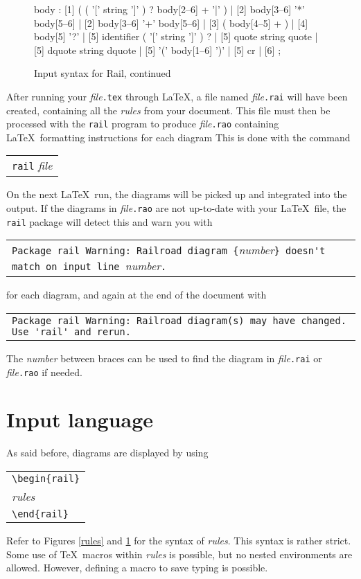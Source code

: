 \documentclass[a4paper]{article}
\newcommand\Rail{Rail}
\newcommand\nt[1]{\textit{#1}}
\newcommand\file[1]{\textit{file}\texttt{.#1}}
\newcommand\lit[1]{\texttt{#1}}
\newenvironment{example}%
{\begin{trivlist}\item[]\begin{tabular}{l}}%
{\end{tabular}\end{trivlist}}
\begin{document}
\begin{figure}
\begin{rail}

body	: [1] ( ( '[' string ']' ) ? body[2--6] + '|' )
	| [2] body[3--6] '*' body[5--6]
	| [2] body[3--6] '+' body[5--6]
	| [3] ( body[4--5] + )
	| [4] body[5] '?'
	| [5] identifier ( '[' string ']' ) ?
	| [5] quote string quote
	| [5] dquote string dquote
	| [5] '(' body[1--6] ')'
	| [5] cr
	| [6]
	;

\end{rail}
\caption{Input syntax for \Rail, continued}
\label{body}
\end{figure}

After running your \file{tex} through \LaTeX, a file named \file{rai} will
have been created, containing all the \nt{rules} from your document.
This file must then be processed with the \lit{rail} program to produce
\file{rao} containing \LaTeX\ formatting instructions for each diagram
This is done with the command
\begin{example}
\texttt{rail} \textit{file}
\end{example}
On the next \LaTeX\ run, the diagrams will be picked up and integrated
into the output.
If the diagrams in \file{rao} are not up-to-date with your \LaTeX\ file,
the \lit{rail} package will detect this and warn you with
\begin{example}
\verb!Package rail Warning: Railroad diagram {!\nt{number}\verb!} doesn't match on input line !\nt{number}\verb!.!
\end{example}
for each diagram, and again at the end of the document with
\begin{example}
\verb!Package rail Warning: Railroad diagram(s) may have changed. Use 'rail' and rerun.!
\end{example}
The \nt{number} between braces can be used to find the diagram in
\file{rai} or \file{rao} if needed.

\section{Input language}

As said before, diagrams are displayed by using
\begin{example}
\verb!\begin{rail}! \\
\nt{rules} \\
\verb!\end{rail}!
\end{example}
Refer to Figures \ref{rules} and \ref{body} for the syntax of \nt{rules}.
This syntax is rather strict. Some use of \TeX\ macros within \nt{rules}
is possible, but no nested environments are allowed. However, defining a
macro to save typing is possible.
\end{document}
